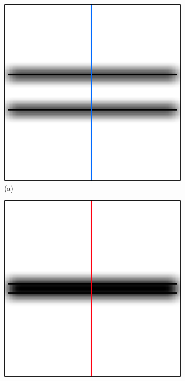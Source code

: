 \begin{figure}[ht!]
    \centering
    \begin{subfigure}{.3\textwidth}
        \centering
        \includegraphics[scale=.075]{figures/FilterRadius/Distant.png}
        \caption*{(a)}
    \end{subfigure}
    \begin{subfigure}{.3\textwidth}
        \centering
        \includegraphics[scale=.075]{figures/FilterRadius/Close.png}

\end{subfigure}
\end{figure}
